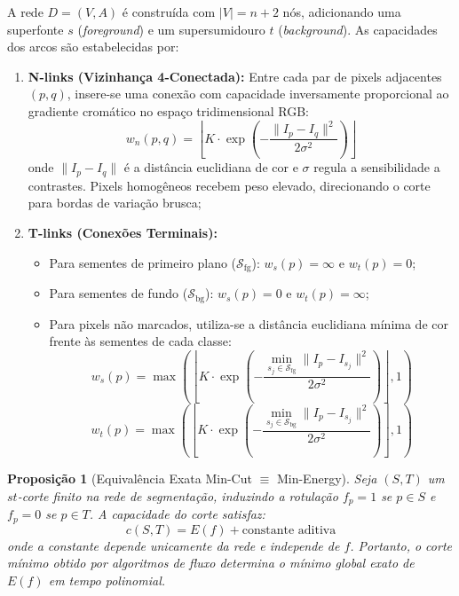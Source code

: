 \documentclass[12pt,a4paper]{article}
\newtheorem{prop}{Proposição}
\begin{document}
A rede $D = (V, A)$ é construída com $|V| = n + 2$ nós, adicionando uma superfonte $s$ (\textit{foreground}) e um supersumidouro $t$ (\textit{background}). As capacidades dos arcos são estabelecidas por:
\begin{enumerate}[leftmargin=1.5em, itemsep=0.15em, topsep=0.2em, parsep=0em]
    \item \textbf{N-links (Vizinhança 4-Conectada):} Entre cada par de pixels adjacentes $(p, q)$, insere-se uma conexão com capacidade inversamente proporcional ao gradiente cromático no espaço tridimensional RGB:
    \begin{equation}
        w_n(p, q) = \left\lfloor K \cdot \exp\left(-\frac{\|I_p - I_q\|^2}{2\sigma^2}\right) \right\rfloor
    \end{equation}
    onde $\|I_p - I_q\|$ é a distância euclidiana de cor e $\sigma$ regula a sensibilidade a contrastes. Pixels homogêneos recebem peso elevado, direcionando o corte para bordas de variação brusca;
    \item \textbf{T-links (Conexões Terminais):}
    \begin{itemize}
        \item Para sementes de primeiro plano ($\mathcal{S}_{\text{fg}}$): $w_s(p) = \infty$ e $w_t(p) = 0$;
        \item Para sementes de fundo ($\mathcal{S}_{\text{bg}}$): $w_s(p) = 0$ e $w_t(p) = \infty$;
        \item Para pixels não marcados, utiliza-se a distância euclidiana mínima de cor frente às sementes de cada classe:
        \begin{equation}
            w_s(p) = \max\left( \left\lfloor K \cdot \exp\left(-\frac{\min_{s_j \in \mathcal{S}_{\text{fg}}} \|I_p - I_{s_j}\|^2}{2\sigma^2}\right) \right\rfloor, 1 \right)
        \end{equation}
        \begin{equation}
            w_t(p) = \max\left( \left\lfloor K \cdot \exp\left(-\frac{\min_{s_j \in \mathcal{S}_{\text{bg}}} \|I_p - I_{s_j}\|^2}{2\sigma^2}\right) \right\rfloor, 1 \right)
        \end{equation}
    \end{itemize}
\end{enumerate}

\begin{prop}[Equivalência Exata Min-Cut $\equiv$ Min-Energy]
Seja $(S, T)$ um $st$-corte finito na rede de segmentação, induzindo a rotulação $f_p = 1$ se $p \in S$ e $f_p = 0$ se $p \in T$. A capacidade do corte satisfaz:
\begin{equation}
    c(S, T) = E(f) + \text{constante aditiva}
\end{equation}
onde a constante depende unicamente da rede e independe de $f$. Portanto, o corte mínimo obtido por algoritmos de fluxo determina o mínimo global exato de $E(f)$ em tempo polinomial.
\end{prop}
\end{document}

